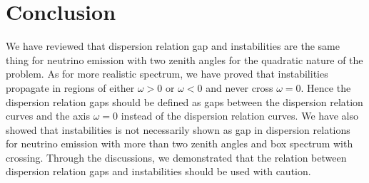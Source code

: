 \section{\label{chap:dr-sec:conclusion}Conclusion}


We have reviewed that dispersion relation gap and instabilities are the same thing for neutrino emission with two zenith angles for the quadratic nature of the problem. As for more realistic spectrum, we have proved that instabilities propagate in regions of either $\omega>0$ or $\omega<0$ and never cross $\omega=0$. Hence the dispersion relation gaps should be defined as gaps between the dispersion relation curves and the axis $\omega=0$ instead of the dispersion relation curves. We have also showed that instabilities is not necessarily shown as gap in dispersion relations for neutrino emission with more than two zenith angles and box spectrum with crossing. Through the discussions, we demonstrated that the relation between dispersion relation gaps and instabilities should be used with caution.

